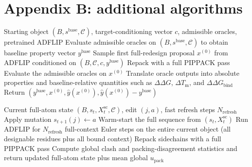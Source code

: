 \documentclass[11pt]{article}
\newcommand{\packunc}{\ensuremath{u_{\mathrm{pack}}}}
\newcommand{\Tm}{\ensuremath{T_{\mathrm m}}}
\newcommand{\Cx}{\mathcal{C}}
\begin{document}
	\section{Appendix B: additional algorithms}
	
	\begin{algorithm}[H]
		\caption{Baseline-aware scoring of the starting object and the first ADFLIP full redesign}
		\label{alg:baseline_seed}
		\begin{algorithmic}[1]
			\Require Starting object $(B, s^{\mathrm{base}}, \Cx)$, target-conditioning vector $c$, admissible oracles, pretrained ADFLIP
			\State Evaluate admissible oracles on $(B, s^{\mathrm{base}}, \Cx)$ to obtain baseline property vector $y^{\mathrm{base}}$
			\State Sample first full-redesign proposal $x^{(0)}$ from ADFLIP conditioned on $(B,\Cx,c,y^{\mathrm{base}})$
			\State Repack with a full PIPPACK pass
			\State Evaluate the admissible oracles on $x^{(0)}$
			\State Translate oracle outputs into absolute properties and baseline-relative quantities such as $\Delta\Delta G$, $\Delta \Tm$, and $\Delta\Delta G_{\mathrm{bind}}$
			\State Return $(y^{\mathrm{base}}, x^{(0)}, \widehat y(x^{(0)}), \widehat y(x^{(0)})-y^{\mathrm{base}})$
		\end{algorithmic}
	\end{algorithm}
	
	\begin{algorithm}[H]
		\caption{Full-context ADFLIP refresh and repacking after a single accepted edit}
		\label{alg:repack}
		\begin{algorithmic}[1]
			\Require Current full-atom state $(B,s_t,X_t^{\mathrm{sc}},\Cx)$, edit $(j,a)$, fast refresh steps $N_{\mathrm{refresh}}$
			\State Apply mutation $s_{t+1}(j)\leftarrow a$
			\State Warm-start the full sequence from $(s_t,X_t^{\mathrm{sc}})$
			\State Run ADFLIP for $N_{\mathrm{refresh}}$ full-context Euler steps on the entire current object (all designable residues plus all bound context)
			\State Repack sidechains with a full PIPPACK pass
			\State Compute global clash and packing-disagreement statistics and return updated full-atom state plus mean global \packunc
		\end{algorithmic}
	\end{algorithm}
	
\end{document}
